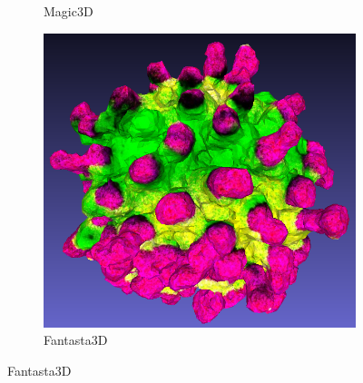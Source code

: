 \begin{figure}[ht]
\begin{subfigure}[b]{0.2\textwidth}
        \caption{Magic3D}
    \end{subfigure}
    \begin{subfigure}[b]{0.218\textwidth}
        \centering
        \includegraphics[width=\textwidth]{etc/a symmetrical tennis ball/fantasia3d/fantasia3d_ball_result.png}
        \caption{Fantasta3D}
    \end{subfigure}


\end{figure}
